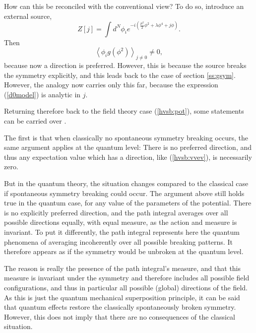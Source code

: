 \documentclass[final,12pt,3p,longtitle]{elsarticle}
\newcommand*{\no}{\noindent}
\newcommand*{\be}{\begin{equation}}
\newcommand*{\ee}{\end{equation}}
\newcommand*{\pref}[1]{(\ref{#1})}
\newcommand*{\nn}{\nonumber}
\newcommand*{\1}{1\!\!\!\bot}
\newcommand*{\la}{\left\langle}
\newcommand*{\ra}{\right\rangle}
\begin{document}
How can this be reconciled with the conventional view? To do so, introduce an external source,
\be
Z[j]=\int d^N\phi_i e^{-i\left(\frac{\mu^2}{2}\phi^2+\lambda\phi^4+j\phi\right)}\label{d0model}.
\ee
\no Then
\be
\la\phi_i g(\phi^2)\ra_{j\neq 0}\neq 0\nn,
\ee
\no because now a direction is preferred. However, this is because the source breaks the symmetry explicitly, and this leads back to the case of section \ref{ss:gsym}. However, the analogy now carries only this far, because the expression \pref{d0model} is analytic in $j$.

Returning therefore back to the field theory case \pref{hvsb:pot}, some statements can be carried over \cite{Perez:2008fv}.

The first is that when classically no spontaneous symmetry breaking occurs, the same argument applies at the quantum level: There is no preferred direction, and thus any expectation value which has a direction, like \pref{hvsb:vvev}, is necessarily zero.

But in the quantum theory, the situation changes compared to the classical case if spontaneous symmetry breaking could occur. The argument above still holds true in the quantum case, for any value of the parameters of the potential. There is no explicitly preferred direction, and the path integral averages over all possible directions equally, with equal measure, as the action and measure is invariant. To put it differently, the path integral represents here the quantum phenomena of averaging incoherently over all possible breaking patterns. It therefore appears as if the symmetry would be unbroken at the quantum level.

The reason is really the presence of the path integral's measure, and that this measure is invariant under the symmetry and therefore includes all possible field configurations, and thus in particular all possible (global) directions of the field. As this is just the quantum mechanical superposition principle, it can be said that quantum effects restore the classically spontaneously broken symmetry. However, this does not imply that there are no consequences of the classical situation.
\end{document}
